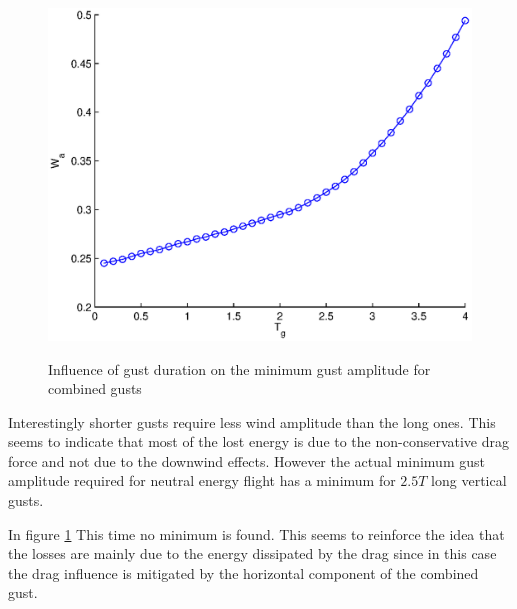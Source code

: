 \begin{figure}[h!]
  \begin{center}
    \scalebox{0.8}
    {\includegraphics{./Figures/Wg_vs_TG_windtype=3_alhpamax=12_nodalphalimit.eps}}
  \end{center}
  \caption{Influence of gust duration on the minimum gust amplitude for combined gusts}
  \label{fig:combined_amplitude_duration}
\end{figure}

\par Interestingly shorter gusts require less wind amplitude than the long ones.
This seems to indicate that most of the lost energy is due to the non-conservative drag force and not due to the downwind effects.
However the actual minimum gust amplitude required for neutral energy flight has a minimum for $2.5T$ long vertical gusts.

\par In figure \ref{fig:combined_amplitude_duration} This time no minimum is found.
This seems to reinforce the idea that the losses are mainly due to the energy dissipated by the drag since in this case the drag influence is mitigated by the horizontal component of the combined gust.

